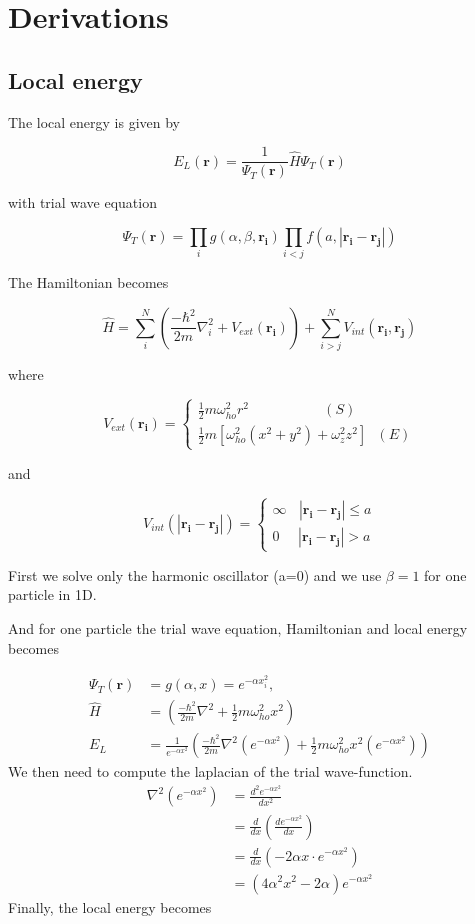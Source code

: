 \section{Derivations}
\subsection{Local energy}\label{app:el}

\setlength\parindent{0pt}

The local energy is given by

$$E_L(\mathbf{r})=\frac{1}{\Psi_T(\mathbf{r})}\hat{H}\Psi_T(\mathbf{r})$$

with trial wave equation

$$\Psi_T(\mathbf{r}) = \prod_{i} g(\alpha, \beta, \mathbf{r_i}) \prod_{i<j} f(a, |\mathbf{r_i} - \mathbf{r_j}|)$$

The Hamiltonian becomes

$$\hat{H} = \sum_{i}^{N} \left( \frac{-\hbar^2}{2m} \nabla_i^2 + V_{ext}(\mathbf{r_i})\right) + \sum_{i>j}^{N} V_{int}(\mathbf{r_i}, \mathbf{r_j})$$

where  

$$
V_{ext}(\mathbf{r_i}) = 
\begin{cases}
\frac{1}{2} m\omega_{ho}^2 r^2\ \ \ \ \ \ \ \ \ \ \ \ \ \ \ \ \ \ \ \ \ \ \ \ (S)\\
\frac{1}{2} m [\omega_{ho}^2(x^2+ y^2) + \omega_z^2 z^2]\ \ \  (E)
\end{cases}
$$

and

$$
V_{int}(|\mathbf{r_i} - \mathbf{r_j}|) = 
\begin{cases}
\infty \ \ \ \   |\mathbf{r_i} - \mathbf{r_j}| \le a \\
0 \ \ \ \ \ \ |\mathbf{r_i} - \mathbf{r_j}| > a
\end{cases}
$$


First we solve only the harmonic oscillator (a=0) and we use $\beta = 1$ for one particle in 1D.

And for one particle the trial wave equation, Hamiltonian and local energy becomes

\begin{align}
\Psi_T(\mathbf{r}) &= g(\alpha, x) = e^{-\alpha x_i^2}, \\
\hat{H} &= \left( \frac{-\hbar^2}{2m} \nabla^2 + \frac{1}{2} m\omega_{ho}^2 x^2\right) \\
E_L &= \frac{1}{e^{-\alpha x^2}}\left( \frac{-\hbar^2}{2m} \nabla^2 (e^{-\alpha x^2}) + \frac{1}{2} m\omega_{ho}^2 x^2(e^{-\alpha x^2})\right)
\end{align}
We then need  to compute the laplacian of the trial wave-function. 
\begin{align}
\nabla^2(e^{-\alpha x^2}) &= \frac{d^2 e^{-\alpha x^2}}{dx^2}\\
&= \frac{d}{dx} \left(\frac{de^{-\alpha x^2}}{dx}\right)\\
&= \frac{d}{dx} (-2\alpha x \cdot e^{-\alpha x^2})\\
&= (4\alpha^2 x^2 - 2\alpha)e^{-\alpha x^2} 
\end{align}
Finally, the local energy becomes 

